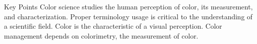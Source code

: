 Key Points
Color science studies the human perception of color, its measurement, and characterization.
Proper terminology usage is critical to the understanding of a scientific field.
Color is the characteristic of a visual perception.
Color management depends on colorimetry, the measurement of color.
